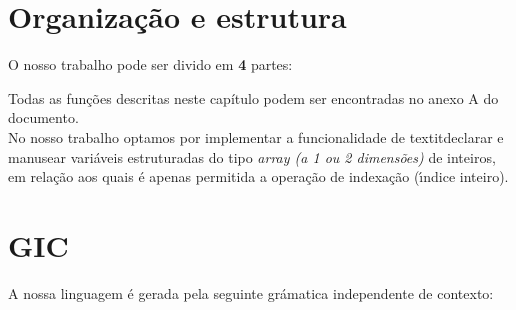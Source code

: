 \documentclass[11pt,a4paper]{report}%
\begin{document}
\section{Organização e estrutura}
O nosso trabalho pode ser divido em \textbf{4} partes:
Todas as funções descritas neste capítulo podem ser encontradas no anexo A do documento.\\
No nosso trabalho optamos por implementar a funcionalidade de textit{declarar e manusear} variáveis estruturadas do tipo \textit{array (a 1 ou 2 dimensões)} de inteiros, em relação aos quais é apenas permitida a operação de indexação (ı́ndice inteiro).\\

\section{GIC}
A nossa linguagem é gerada pela seguinte grámatica independente de contexto:
\end{document}
